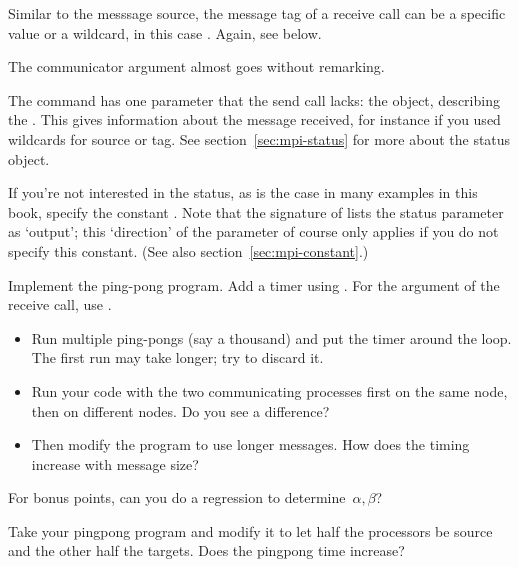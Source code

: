 Similar to the messsage source, the message tag of a receive call can
be a specific value or a wildcard, in this case
.
Again, see below.

The communicator argument almost goes without remarking.

The  command has one parameter that
the send call lacks: the  object,
describing the .
This gives information about the message received,
for instance if you used wildcards for source or tag.
See section~\ref{sec:mpi-status}
for more about the status object.

\begin{remark}
  If you're not interested in the status,
  as is the case in many examples in this book,
  specify the constant .
  Note that the signature of  lists the status parameter
  as `output'; this `direction' of the parameter of course only applies
  if you do not specify this constant.
  (See also section~\ref{sec:mpi-constant}.)
\end{remark}

\begin{exercise}
  \label{ex:pingpong}
  Implement the ping-pong program. Add a timer using .
  For the  argument of the receive call, use
  .

  \begin{itemize}
  \item Run multiple ping-pongs (say a thousand) and put the timer
    around the loop. The first run may take longer; try to discard it.
  \item Run your code with the two communicating processes first on
    the same node, then on different nodes. Do you see a difference?
  \item Then modify the program
    to use longer messages. How does the timing increase with message size?
  \end{itemize}
  For bonus points, can you do a regression to determine~$\alpha,\beta$?
\end{exercise}

\begin{exercise}
  \label{ex:hbwpingpong}
  Take your pingpong program and modify it 
  to let half the processors
  be source and the other half the targets. Does the pingpong time increase?
\end{exercise}

